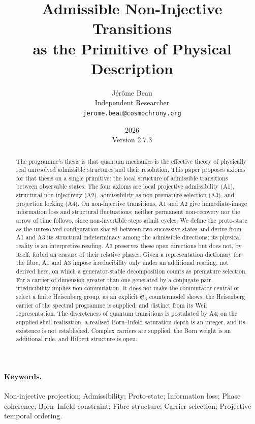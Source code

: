 \documentclass[11pt,a4paper]{article}
\title{Admissible Non-Injective Transitions\\
as the Primitive of Physical Description}
\author{J\'er\^ome Beau\\
\small Independent Researcher\\
\small \texttt{jerome.beau@cosmochrony.org}}
\date{2026\\[2pt]\small Version 2.7.3}
\begin{document}
  \maketitle

  \begin{abstract}
    The programme's thesis is that quantum mechanics is the effective theory of physically real
    unresolved admissible structures and their resolution.
    This paper proposes axioms for that thesis on a single primitive: the local structure of admissible
    transitions between observable states.
    The four axioms are local projective admissibility (A1), structural non-injectivity (A2),
    admissibility as non-premature selection (A3), and projection locking (A4).
    On non-injective transitions, A1 and A2 give immediate-image information loss and structural
    fluctuations; neither permanent non-recovery nor the arrow of
    time follows, since non-invertible steps admit cycles.
    We define the proto-state as the unresolved configuration shared between two successive states and
    derive from A1 and A3 its structural indeterminacy among the admissible directions; its physical reality is
    an interpretive reading.
    A3 preserves these open directions but does not, by itself, forbid an erasure of their relative phases.
    Given a representation dictionary for the fibre, A1 and A3 impose irreducibility only under an
    additional reading, not derived here, on which a generator-stable decomposition counts as premature
    selection.
    For a carrier of dimension greater than one generated by a conjugate pair,
    irreducibility implies non-commutation.
    It does not make the commutator central or select a finite Heisenberg group, as an explicit
    $\mathfrak{S}_3$ countermodel shows: the Heisenberg carrier of the spectral programme is supplied,
    and distinct from its Weil representation.
    The discreteness of quantum transitions is postulated by A4; on the supplied shell realisation, a
    realised Born--Infeld saturation depth is an integer, and its existence is not established.
    Complex carriers are supplied, the Born weight is an additional rule, and Hilbert structure is open.
  \end{abstract}

  \paragraph{Keywords.}
    Non-injective projection; Admissibility; Proto-state; Information loss; Phase coherence;
    Born--Infeld constraint; Fibre structure; Carrier selection; Projective temporal ordering.
\end{document}
